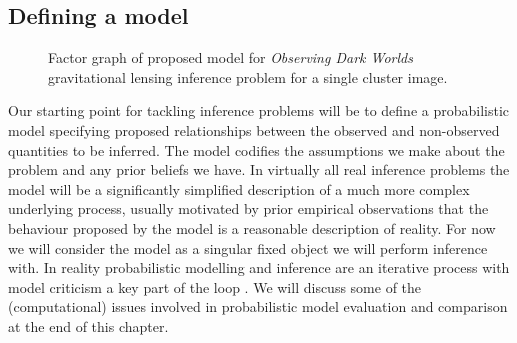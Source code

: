 \subsection{Defining a model}

\begin{figure}[!t]
\vskip 0pt
\centering
{}
\vskip 5pt
\caption[Gravitational lensing model factor graph.]{Factor graph of proposed model for \emph{Observing Dark Worlds} gravitational lensing inference problem for a single cluster image.}
\label{fig:observing-dark-worlds-factor-graph}
\end{figure}

Our starting point for tackling inference problems will be to define a probabilistic model specifying proposed relationships between the observed and non-observed quantities to be inferred. The model codifies the assumptions we make about the problem and any prior beliefs we have. In virtually all real inference problems the model will be a significantly simplified description of a much more complex underlying process, usually motivated by prior empirical observations that the behaviour proposed by the model is a reasonable description of reality. For now we will consider the model as a singular fixed object we will perform inference with. In reality probabilistic modelling and inference are an iterative process with model criticism a key part of the loop \citep{box1980sampling,gelman2013philosophy}. We will discuss some of the (computational) issues involved in probabilistic model evaluation and comparison at the end of this chapter.

